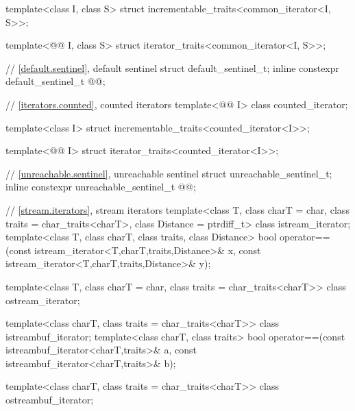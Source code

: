 \begin{codeblock}
{  template<class I, class S>
    struct incrementable_traits<common_iterator<I, S>>;

  template<@@ I, class S>
    struct iterator_traits<common_iterator<I, S>>;

  // \ref{default.sentinel}, default sentinel
  struct default_sentinel_t;
  inline constexpr default_sentinel_t @@{};

  // \ref{iterators.counted}, counted iterators
  template<@@ I> class counted_iterator;

  template<class I>
    struct incrementable_traits<counted_iterator<I>>;

  template<@@ I>
    struct iterator_traits<counted_iterator<I>>;

  // \ref{unreachable.sentinel}, unreachable sentinel
  struct unreachable_sentinel_t;
  inline constexpr unreachable_sentinel_t @@{};

  // \ref{stream.iterators}, stream iterators
  template<class T, class charT = char, class traits = char_traits<charT>,
           class Distance = ptrdiff_t>
  class istream_iterator;
  template<class T, class charT, class traits, class Distance>
    bool operator==(const istream_iterator<T,charT,traits,Distance>& x,
            const istream_iterator<T,charT,traits,Distance>& y);

  template<class T, class charT = char, class traits = char_traits<charT>>
      class ostream_iterator;

  template<class charT, class traits = char_traits<charT>>
    class istreambuf_iterator;
  template<class charT, class traits>
    bool operator==(const istreambuf_iterator<charT,traits>& a,
            const istreambuf_iterator<charT,traits>& b);

  template<class charT, class traits = char_traits<charT>>
    class ostreambuf_iterator;

}
\end{codeblock}
